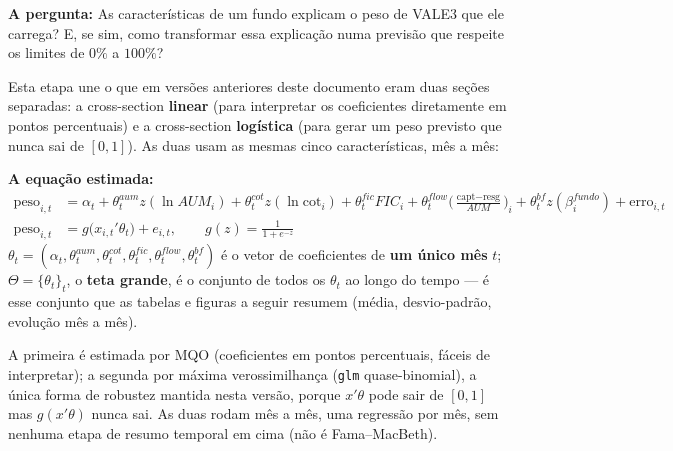 \documentclass[11pt,a4paper]{article}
\newcommand{\pergunta}[1]{\par\vspace{4pt}\noindent\textbf{\color{azul}A pergunta:} #1\par\vspace{2pt}}
\newcommand{\equacao}[0]{\par\vspace{4pt}\noindent\textbf{\color{vermelho}A equação estimada:}\ }
\begin{document}
\pergunta{As características de um fundo explicam o peso de VALE3 que ele carrega? E, se sim,
como transformar essa explicação numa previsão que respeite os limites de $0\%$ a $100\%$?}

Esta etapa une o que em versões anteriores deste documento eram duas seções separadas: a
cross-section \textbf{linear} (para interpretar os coeficientes diretamente em pontos
percentuais) e a cross-section \textbf{logística} (para gerar um peso previsto que nunca sai de
$[0,1]$). As duas usam as mesmas cinco características, mês a mês:

\equacao
\begin{align}
\text{peso}_{i,t} &= \alpha_t + \theta^{aum}_t z(\ln AUM_{i}) + \theta^{cot}_t z(\ln\text{cot}_{i})
  + \theta^{fic}_t FIC_i + \theta^{flow}_t\Big(\tfrac{\text{capt}-\text{resg}}{AUM}\Big)_i
  + \theta^{bf}_t z(\beta^{fundo}_i) + \text{erro}_{i,t} \label{eq:cs}\\[4pt]
\text{peso}_{i,t} &= g\big(x_{i,t}'\theta_t\big) + e_{i,t}, \qquad g(z)=\frac{1}{1+e^{-z}}
\label{eq:logit}
\end{align}
$\theta_t=(\alpha_t,\theta^{aum}_t,\theta^{cot}_t,\theta^{fic}_t,\theta^{flow}_t,\theta^{bf}_t)$
é o vetor de coeficientes de \textbf{um único mês} $t$; $\Theta=\{\theta_t\}_{t}$, o \textbf{teta
grande}, é o conjunto de todos os $\theta_t$ ao longo do tempo --- é esse conjunto que as tabelas
e figuras a seguir resumem (média, desvio-padrão, evolução mês a mês).

A primeira é estimada por MQO (coeficientes em pontos percentuais, fáceis de interpretar); a
segunda por máxima verossimilhança (\texttt{glm} quase-binomial), a única forma de robustez
mantida nesta versão, porque $x'\theta$ pode sair de $[0,1]$ mas $g(x'\theta)$ nunca sai. As
duas rodam mês a mês, uma regressão por mês, sem nenhuma etapa de resumo temporal em cima
(não é Fama--MacBeth).
\end{document}
